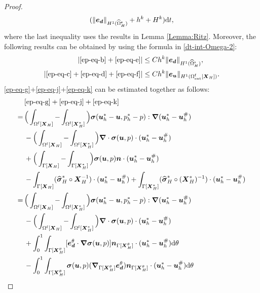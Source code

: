 \documentclass[11pt,reqno]{amsart}
\theoremstyle{definition}
\theoremstyle{plain}
\numberwithin{theorem}{section}
\numberwithin{proposition}{section}
\numberwithin{lemma}{section}
\numberwithin{equation}{section}
\newcommand{\bs}[1]{\boldsymbol{#1}}
\newcommand{\uu}[1]  {{\bs{#1}} }
\newcommand{\grad}   { \uu{\nabla}    }
\def\d{\mathrm{d}}
\newcommand{\bu}{\uu{u}}
\renewcommand{\(}{\bigl(}
\renewcommand{\)}{\bigr)}
\begin{document}
\begin{proof}
\begin{align*}
(\|{\bs e}_{\bs d}\|_{H^1(\widehat\Omega^{\rm s}_H)} + h^k + H^k) \d t ,
\end{align*}
where the last inequality uses the results in Lemma \ref{Lemma:Ritz}. Moreover, the following results can be obtained by using the formula in \eqref{dt-int-Omega-2}: 
\begin{align*}
|\eqref{ep-eq-b}+\eqref{ep-eq-e}|
&\le Ch^k\|{\bs e}_{\bs d}\|_{H^1(\widehat{\Omega}_H^{\rm s})} ,\\
|\eqref{ep-eq-c}+\eqref{ep-eq-d}+\eqref{ep-eq-f}|
&\le Ch^k\|{\bs e}_{\bs u}\|_{H^1(\Omega^{\rm f}_{\rm ext}[\bs X_H])} .
\end{align*}
\eqref{ep-eq-g}+\eqref{ep-eq-j}+\eqref{ep-eq-k} can be estimated together as follows: 
\begin{subequations}\label{ep-eq-gjk}
\begin{align}
  & \eqref{ep-eq-g}+\eqref{ep-eq-j}+\eqref{ep-eq-k} \notag\\
=\,& \Big(\int_{\Omega^{\rm f}[\bs X_H]} -\int_{\Omega^{\rm f}[\bs X_H^*]} \Big) {\bs \sigma}(\bu_h^*-{\bs u},p_h^*-p): \grad ({\bs u}_h^*-{\bs u}_h^\#) \notag\\
  & - \Big(\int_{\Omega^{\rm f}[\bs X_H]} -\int_{\Omega^{\rm f}[\bs X_H^*]} \Big) \grad\cdot{\bs \sigma}({\bs u},p) \cdot ({\bs u}_h^*-{\bs u}_h^\#) \notag\\
  & + \Big(\int_{\Gamma[\bs X_H]} -\int_{\Gamma[\bs X_H^*]} \Big) {\bs \sigma}({\bs u},p){\bs n} \cdot ({\bs u}_h^*-{\bs u}_h^\#) \notag\\
  & - \int_{\Gamma[\bs X_H]} ({\widehat{\bs \sigma} }_H^*\circ {\bs X}_H^{-1}) \cdot ({\bs u}_h^*-{\bs u}_h^\#) + \int_{\Gamma[\bs X_H^*]} ({\widehat{\bs \sigma} }_H^*\circ ({\bs X}_H^*)^{-1}) \cdot ({\bs u}_h^*-{\bs u}_h^\#) \notag\\
=\,& \Big(\int_{\Omega^{\rm f}[\bs X_H]} -\int_{\Omega^{\rm f}[\bs X_H^*]} \Big) {\bs \sigma}(\bu_h^*-{\bs u},p_h^*-p): \grad ({\bs u}_h^*-{\bs u}_h^\#) \label{ep-eq-gjk-a}\\
  & - \Big(\int_{\Omega^{\rm f}[\bs X_H]} -\int_{\Omega^{\rm f}[\bs X_H^*]} \Big) \grad\cdot{\bs \sigma}({\bs u},p) \cdot ({\bs u}_h^*-{\bs u}_h^\#) \label{ep-eq-gjk-b}\\
  & + \int_0^1\int_{\Gamma[\bs X_H^\theta]} [{\bs e}_{\bs d}^\theta\cdot\grad{\bs \sigma}({\bs u},p)]{\bs n}_{\Gamma[{\bs X}_H^\theta]}\cdot ({\bs u}_h^*-{\bs u}_h^\#) \d\theta \label{ep-eq-gjk-c}\\
  & - \int_0^1\int_{\Gamma[\bs X_H^\theta]} {\bs \sigma}({\bs u},p)(\grad_{\Gamma[\bs X_H^\theta]}{\bs e}_{\bs d}^\theta){\bs n}_{\Gamma[{\bs X}_H^\theta]} \cdot ({\bs u}_h^*-{\bs u}_h^\#) \d\theta \label{ep-eq-gjk-d}

\end{align}
\end{subequations}
\end{proof}
\end{document}
